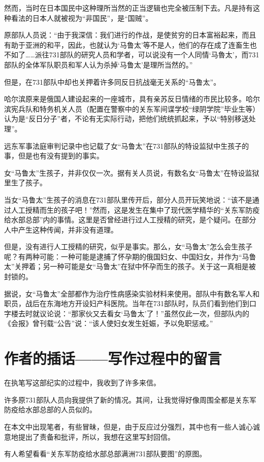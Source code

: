 \documentclass[a4paper,12pt,UTF8,twoside]{ctexbook}
\begin{document}
然而，当时在日本国民中这种理所当然的正当逻辑也完全被压制下去。凡是持有这种看法的日本人就被视为“非国民”，是“国贼”。

原部队人员说：“由于我深信：我们进行的作战，是使贫穷的日本富裕起来，而且有助于亚洲的和平，因此，也就认为‘马鲁太’等不是人，他们的存在成了连畜生也不如了……派往731部队的研究人员和学者，可以说没有一个人同情‘马魯太’，而731部队的全体军队职员和军人认为杀掉‘马鲁太’是理所当然的。”

但是，在731部队中却也关押着许多同反日抗战毫无关系的“马鲁太”。

哈尔滨原来是俄国人建设起来的一座城市，具有亲苏反日情绪的市民比较多。哈尔滨宪兵队和特务机关人员（配置在警察中的关东军间谍学校“绿阴学院”毕业生等）认为是“反日分子”者，不论有无实际行动，把他们统统抓起来，予以“特别移送处理”。

远东军事法庭审判记录中也记载了女“马鲁太”在731部队的特设监狱中生孩子的事，但是也有没有提到的事实。

女“马鲁太”生孩子，并非仅仅一次。据有关人员说，有数名女“马鲁太”在特设监狱里生了孩子。

当女“马鲁太”生孩子的消息在731部队里传开后，部分人员开玩笑地说：“该不是通过人工授精而生的孩子吧！”然而，这是发生在集中了现代医学精华的“关东军防疫给水部总部”内的事情。这里是否曾经进行过人工授精的研究，是个疑问。在部分人中产生这种传闻，并非没有道理。

但是，没有进行人工授精的研究，似乎是事实。那么，女“马鲁太”怎么会生孩子呢？有两种可能：一种可能是逮捕了怀孕期的俄国妇女、中国妇女，并作为“马鲁太”关押着；另一种可能是女“马鲁太”在狱中怀孕而生的孩子。关于这一真相是被封锁的。

据说，女“马鲁太”全部都作为治疗性病感染实验材料来使用。部队中有数名军人和职员，战后在东海地方开设妇产科医院。当年在731部队时，队员们看到他们到口字楼去时就议论说：“那家伙又去看女‘马鲁太’了！”虽然仅此一次，但部队内的《会报》曾刊载“公告”说：“该人使妇女发生妊娠，予以免职惩戒。”

\section{作者的插话——写作过程中的留言}

在执笔写这部纪实的过程中，我收到了许多来信。

许多原731部队人员向我提供了新的情况。其间，让我觉得好像周围全都是关东军防疫给水部总部的人员似的。

在本文中出现笔者，有些冒昧，但是，由于反应过分强烈，其中也有一些人诚心诚意地提出了责备和批评，所以，我想在这里写封回信。

有人希望看看“关东军防疫给水部总部满洲731部队要图”的原图。
\end{document}
